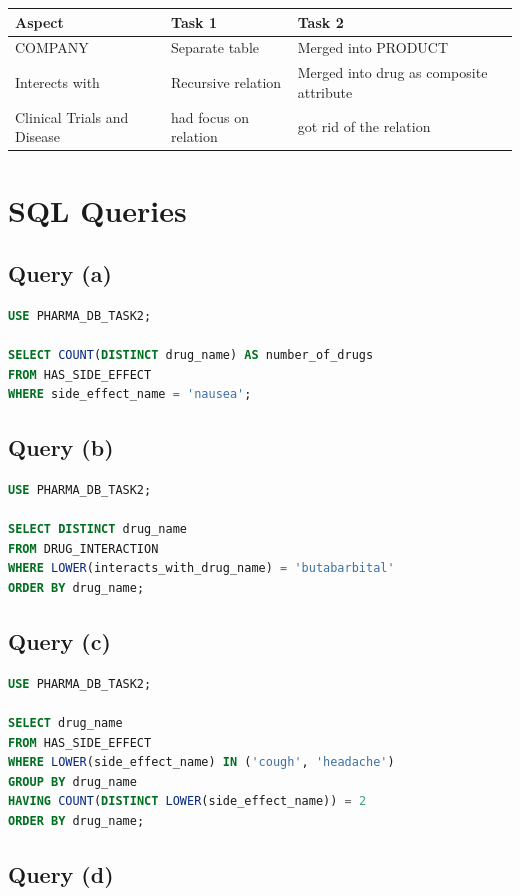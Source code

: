 \documentclass[15pt,a4paper]{article}
\begin{document}
\begin{longtable}{|p{4cm}|p{4cm}|p{4cm}|}
\hline
\textbf{Aspect} & \textbf{Task 1} & \textbf{Task 2} \\
\hline
COMPANY & Separate table & Merged into PRODUCT \\
\hline
Interects with & Recursive relation & Merged into drug as composite attribute \\ 
\hline
Clinical Trials and Disease & had focus on relation & got rid of the relation \\
\hline
\end{longtable}

\section{SQL Queries}

\subsection{Query (a)}
\begin{lstlisting}[language=SQL]
USE PHARMA_DB_TASK2;

SELECT COUNT(DISTINCT drug_name) AS number_of_drugs
FROM HAS_SIDE_EFFECT
WHERE side_effect_name = 'nausea';
\end{lstlisting}

\subsection{Query (b)}

\begin{lstlisting}[language=SQL]
USE PHARMA_DB_TASK2;

SELECT DISTINCT drug_name
FROM DRUG_INTERACTION
WHERE LOWER(interacts_with_drug_name) = 'butabarbital'
ORDER BY drug_name;
\end{lstlisting}
\subsection{Query (c)}

\begin{lstlisting}[language=SQL]
USE PHARMA_DB_TASK2;

SELECT drug_name
FROM HAS_SIDE_EFFECT
WHERE LOWER(side_effect_name) IN ('cough', 'headache')
GROUP BY drug_name
HAVING COUNT(DISTINCT LOWER(side_effect_name)) = 2
ORDER BY drug_name;
\end{lstlisting}
\subsection{Query (d)}
\end{document}

